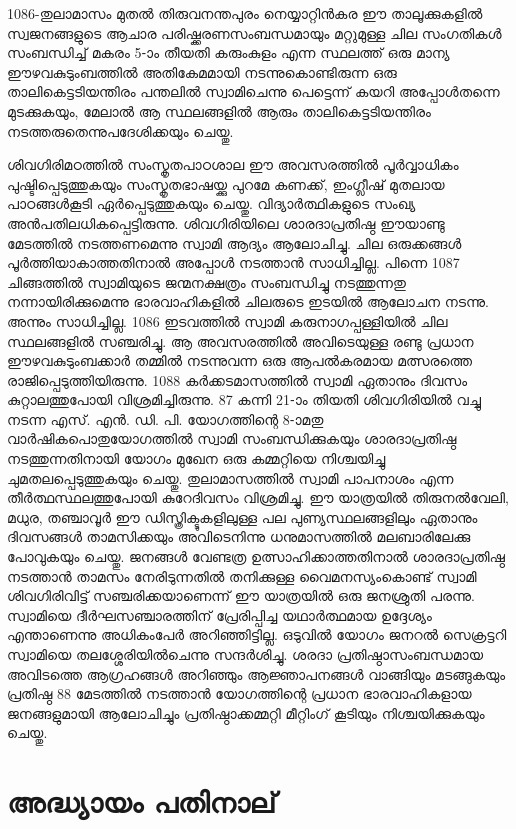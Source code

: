 \documentclass[12pt,openany]{book}
\begin{document}
	1086-തുലാമാസം മുതൽ തിരുവനന്തപുരം നെയ്യാറ്റിൻകര ഈ താലൂക്കുകളിൽ സ്വജനങ്ങളുടെ ആചാര പരിഷ്ക്കരണസംബന്ധമായും മറ്റുമുള്ള ചില സംഗതികൾ സംബന്ധിച്ച് മകരം 5-ാം തീയതി കരുംകുളം എന്ന സ്ഥലത്ത് ഒരു മാന്യ ഈഴവകുടുംബത്തിൽ അതികേമമായി നടന്നുകൊണ്ടിരുന്ന ഒരു താലികെട്ടടിയന്തിരം പന്തലിൽ സ്വാമിചെന്നു പെട്ടെന്ന് കയറി അപ്പോൾതന്നെ മുടക്കുകയും, മേലാൽ ആ സ്ഥലങ്ങളിൽ ആരും താലികെട്ടടിയന്തിരം നടത്തരുതെന്നുപദേശിക്കയും ചെയ്തു.
	
	ശിവഗിരിമഠത്തിൽ സംസ്കൃതപാഠശാല ഈ അവസരത്തിൽ പൂർവ്വാധികം പുഷ്ടിപ്പെടുത്തുകയും സംസ്കൃതഭാഷയ്ക്കു പുറമേ കണക്ക്, ഇംഗ്ലീഷ് മുതലായ പാഠങ്ങൾകൂടി ഏർപ്പെടുത്തുകയും ചെയ്തു. വിദ്യാർത്ഥികളുടെ സംഖ്യ അൻപതിലധികപ്പെട്ടിരുന്നു. ശിവഗിരിയിലെ ശാരദാപ്രതിഷ്ഠ ഈയാണ്ടു മേടത്തിൽ നടത്തണമെന്നു സ്വാമി ആദ്യം ആലോചിച്ചു. ചില ഒരുക്കങ്ങൾ പൂർത്തിയാകാത്തതിനാൽ അപ്പോൾ നടത്താൻ സാധിച്ചില്ല. പിന്നെ 1087 ചിങ്ങത്തിൽ സ്വാമിയുടെ ജന്മനക്ഷത്രം സംബന്ധിച്ചു നടത്തുന്നതു നന്നായിരിക്കുമെന്നു ഭാരവാഹികളിൽ ചിലരുടെ ഇടയിൽ ആലോചന നടന്നു. അന്നും സാധിച്ചില്ല. 1086 ഇടവത്തിൽ സ്വാമി കരുനാഗപ്പള്ളിയിൽ ചില സ്ഥലങ്ങളിൽ സഞ്ചരിച്ചു. ആ അവസരത്തിൽ അവിടെയുള്ള രണ്ടു പ്രധാന ഈഴവകുടുംബക്കാർ തമ്മിൽ നടന്നുവന്ന ഒരു ആപൽകരമായ മത്സരത്തെ രാജിപ്പെടുത്തിയിരുന്നു. 1088 കർക്കടമാസത്തിൽ സ്വാമി ഏതാനും ദിവസം കുറ്റാലത്തുപോയി വിശ്രമിച്ചിരുന്നു. 87 കന്നി 21-ാം തിയതി ശിവഗിരിയിൽ വച്ചു നടന്ന എസ്. എൻ. ഡി. പി. യോഗത്തിന്റെ 8-ാമതു വാർഷികപൊതുയോഗത്തിൽ സ്വാമി സംബന്ധിക്കുകയും ശാരദാപ്രതിഷ്ഠ നടത്തുന്നതിനായി യോഗം മുഖേന ഒരു കമ്മറ്റിയെ നിശ്ചയിച്ചു ചുമതലപ്പെടുത്തുകയും ചെയ്തു. തുലാമാസത്തിൽ സ്വാമി പാപനാശം എന്ന തീർത്ഥസ്ഥലത്തുപോയി കുറേദിവസം വിശ്രമിച്ചു. ഈ യാത്രയിൽ തിരുനൽവേലി, മധുര, തഞ്ചാവൂർ ഈ ഡിസ്ത്രിക്ടുകളിലുള്ള പല പുണ്യസ്ഥലങ്ങളിലും ഏതാനും ദിവസങ്ങൾ താമസിക്കയും അവിടെനിന്നു ധനുമാസത്തിൽ മലബാരിലേക്കു പോവുകയും ചെയ്തു. ജനങ്ങൾ വേണ്ടത്ര ഉത്സാഹിക്കാത്തതിനാൽ ശാരദാപ്രതിഷ്ഠ നടത്താൻ താമസം നേരിടുന്നതിൽ തനിക്കുള്ള വൈമനസ്യംകൊണ്ട് സ്വാമി ശിവഗിരിവിട്ട് സഞ്ചരിക്കയാണെന്ന് ഈ യാത്രയിൽ ഒരു ജനശ്രുതി പരന്നു. സ്വാമിയെ ദീർഘസഞ്ചാരത്തിന് പ്രേരിപ്പിച്ച യഥാർത്ഥമായ ഉദ്ദേശ്യം എന്താണെന്നു അധികംപേർ അറിഞ്ഞിട്ടില്ല. ഒടുവിൽ യോഗം ജനറൽ സെക്രട്ടറി സ്വാമിയെ തലശ്ശേരിയിൽചെന്നു സന്ദർശിച്ചു. ശരദാ പ്രതിഷ്ഠാസംബന്ധമായ അവിടത്തെ ആഗ്രഹങ്ങൾ അറിഞ്ഞും ആജ്ഞാപനങ്ങൾ വാങ്ങിയും മടങ്ങുകയും പ്രതിഷ്ഠ 88 മേടത്തിൽ നടത്താൻ യോഗത്തിന്റെ പ്രധാന ഭാരവാഹികളായ ജനങ്ങളുമായി ആലോചിച്ചും പ്രതിഷ്ഠാക്കമ്മറ്റി മീറ്റിംഗ് കൂടിയും നിശ്ചയിക്കുകയും ചെയ്തു.
	
	\newpage
	\chapter*{അദ്ധ്യായം പതിനാല്}
	
\end{document}
